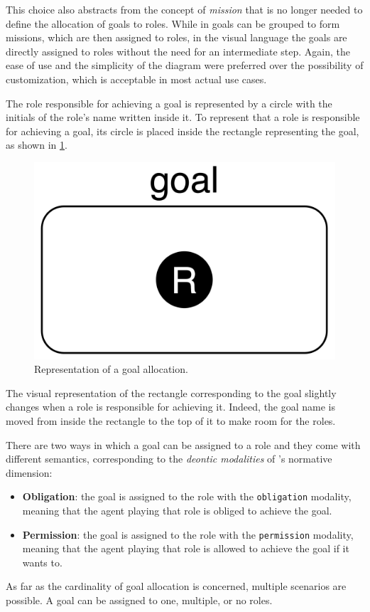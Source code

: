 This choice also abstracts from the concept of \textit{mission} that is no longer needed to define the allocation of goals to roles.
While in \moise{} goals can be grouped to form missions, which are then assigned to roles, in the visual language the goals are directly assigned to roles without the need for an intermediate step.
Again, the ease of use and the simplicity of the diagram were preferred over the possibility of customization, which is acceptable in most actual use cases.

The role responsible for achieving a goal is represented by a circle with the initials of the role's name written inside it.
To represent that a role is responsible for achieving a goal, its circle is placed inside the rectangle representing the goal, as shown in \cref{fig:goal-allocation}.

\begin{figure}[H]
    \centering
    \includegraphics[width=0.3\linewidth]{images/visual-language/goal-allocation.png}
    \caption{Representation of a goal allocation.}
    \label{fig:goal-allocation}
\end{figure}

The visual representation of the rectangle corresponding to the goal slightly changes when a role is responsible for achieving it.
Indeed, the goal name is moved from inside the rectangle to the top of it to make room for the roles.

There are two ways in which a goal can be assigned to a role and they come with different semantics, corresponding to the \textit{deontic modalities} of \moise{}'s normative dimension:
\begin{itemize}
    \item \textbf{Obligation}: the goal is assigned to the role with the \texttt{obligation} modality, meaning that the agent playing that role is obliged to achieve the goal.
    \item \textbf{Permission}: the goal is assigned to the role with the \texttt{permission} modality, meaning that the agent playing that role is allowed to achieve the goal if it wants to.
\end{itemize}

As far as the cardinality of goal allocation is concerned, multiple scenarios are possible.
A goal can be assigned to one, multiple, or no roles.

